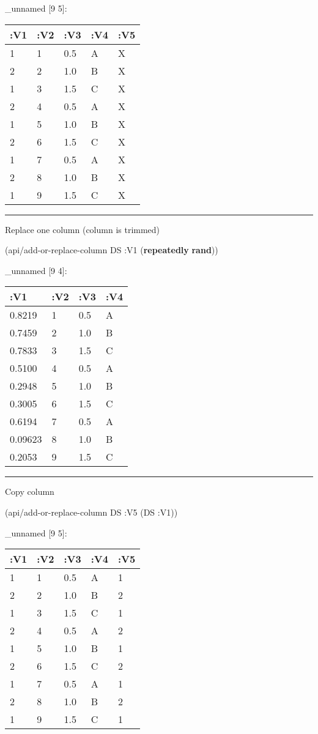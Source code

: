 \documentclass[]{article}
\newenvironment{Shaded}{\begin{snugshade}}{\end{snugshade}}
\newcommand{\AttributeTok}[1]{\textcolor[rgb]{0.77,0.63,0.00}{#1}}
\newcommand{\KeywordTok}[1]{\textcolor[rgb]{0.13,0.29,0.53}{\textbf{#1}}}
\newcommand{\NormalTok}[1]{#1}
\begin{document}
\_unnamed {[}9 5{]}:

\begin{longtable}[]{@{}lllll@{}}
\toprule
:V1 & :V2 & :V3 & :V4 & :V5\tabularnewline
\midrule
\endhead
1 & 1 & 0.5 & A & X\tabularnewline
2 & 2 & 1.0 & B & X\tabularnewline
1 & 3 & 1.5 & C & X\tabularnewline
2 & 4 & 0.5 & A & X\tabularnewline
1 & 5 & 1.0 & B & X\tabularnewline
2 & 6 & 1.5 & C & X\tabularnewline
1 & 7 & 0.5 & A & X\tabularnewline
2 & 8 & 1.0 & B & X\tabularnewline
1 & 9 & 1.5 & C & X\tabularnewline
\bottomrule
\end{longtable}

\begin{center}\rule{0.5\linewidth}{0.5pt}\end{center}

Replace one column (column is trimmed)

\begin{Shaded}
\begin{Highlighting}[]
\NormalTok{(api/add-or-replace-column DS }\AttributeTok{:V1}\NormalTok{ (}\KeywordTok{repeatedly} \KeywordTok{rand}\NormalTok{))}
\end{Highlighting}
\end{Shaded}

\_unnamed {[}9 4{]}:

\begin{longtable}[]{@{}llll@{}}
\toprule
:V1 & :V2 & :V3 & :V4\tabularnewline
\midrule
\endhead
0.8219 & 1 & 0.5 & A\tabularnewline
0.7459 & 2 & 1.0 & B\tabularnewline
0.7833 & 3 & 1.5 & C\tabularnewline
0.5100 & 4 & 0.5 & A\tabularnewline
0.2948 & 5 & 1.0 & B\tabularnewline
0.3005 & 6 & 1.5 & C\tabularnewline
0.6194 & 7 & 0.5 & A\tabularnewline
0.09623 & 8 & 1.0 & B\tabularnewline
0.2053 & 9 & 1.5 & C\tabularnewline
\bottomrule
\end{longtable}

\begin{center}\rule{0.5\linewidth}{0.5pt}\end{center}

Copy column

\begin{Shaded}
\begin{Highlighting}[]
\NormalTok{(api/add-or-replace-column DS }\AttributeTok{:V5}\NormalTok{ (DS }\AttributeTok{:V1}\NormalTok{))}
\end{Highlighting}
\end{Shaded}

\_unnamed {[}9 5{]}:

\begin{longtable}[]{@{}lllll@{}}
\toprule
:V1 & :V2 & :V3 & :V4 & :V5\tabularnewline
\midrule
\endhead
1 & 1 & 0.5 & A & 1\tabularnewline
2 & 2 & 1.0 & B & 2\tabularnewline
1 & 3 & 1.5 & C & 1\tabularnewline
2 & 4 & 0.5 & A & 2\tabularnewline
1 & 5 & 1.0 & B & 1\tabularnewline
2 & 6 & 1.5 & C & 2\tabularnewline
1 & 7 & 0.5 & A & 1\tabularnewline
2 & 8 & 1.0 & B & 2\tabularnewline
1 & 9 & 1.5 & C & 1\tabularnewline
\bottomrule
\end{longtable}
\end{document}
